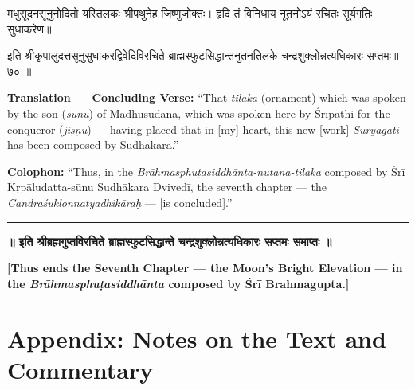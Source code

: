 \documentclass[11pt,a4paper]{article}
\newcommand{\dev}[1]{{\devanagarifont #1}}
\newenvironment{sanskritverse}{%
  \begin{center}\begin{minipage}{0.95\textwidth}
  \setlength{\leftskip}{1em}
  \setlength{\rightskip}{1em}
  \dev
}{\end{minipage}\end{center}}
\newenvironment{paracol}[1]{\begingroup}{\endgroup}
\newcommand{\switchcolumn}[1][]{%
  \ifnum#1=0\relax\else\par\nobreak\vspace{0.5em}\par\nobreak\fi%
}
\begin{document}
\begin{paracol}{2}

\begin{sanskritverse}
मधुसूदनसूनुनोदितो यस्तिलकः श्रीपथुनेह जिष्णुजोक्तः।
हृदि तं विनिधाय नूतनोऽयं रचितः सूर्यगतिः सुधाकरेण॥
\end{sanskritverse}

\begin{sanskritverse}
इति श्रीकृपालुदत्तसूनुसुधाकरद्विवेदिविरचिते ब्राह्मस्फुटसिद्धान्तनुतनतिलके
चन्द्रशुक्लोन्नत्यधिकारः सप्तमः॥ ७० ॥
\end{sanskritverse}

\switchcolumn

\textbf{Translation — Concluding Verse:} ``That \textit{tilaka} (ornament) which was spoken by the son (\textit{sūnu}) of Madhusūdana, which was spoken here by Śrīpathi for the conqueror (\textit{jiṣṇu}) --- having placed that in [my] heart, this new [work] \textit{Sūryagati} has been composed by Sudhākara.''

\textbf{Colophon:} ``Thus, in the \textit{Brāhmasphuṭasiddhānta-nutana-tilaka} composed by Śrī Kṛpāludatta-sūnu Sudhākara Dvivedī, the seventh chapter --- the \textit{Candraśuklonnatyadhikāraḥ} --- [is concluded].''

\end{paracol}

\begin{center}
\textcolor{rulecolor}{\rule{0.8\textwidth}{0.5pt}}
\end{center}

\noindent\textbf{\dev{॥ इति श्रीब्रह्मगुप्तविरचिते ब्राह्मस्फुटसिद्धान्ते चन्द्रशुक्लोन्नत्यधिकारः सप्तमः समाप्तः ॥}}

\noindent\textbf{[Thus ends the Seventh Chapter --- the Moon's Bright Elevation --- in the \textit{Brāhmasphuṭasiddhānta} composed by Śrī Brahmagupta.]}

\vspace{2cm}

\newpage
\section*{Appendix: Notes on the Text and Commentary}
\end{document}

